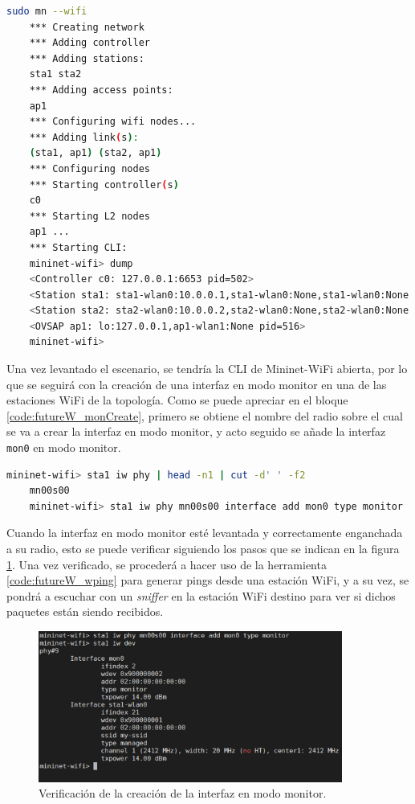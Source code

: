 \begin{lstlisting}[language= bash, style=Consola, caption={Ejecución del escenario},label=code:futureW_monScenario]
    sudo mn --wifi
    *** Creating network
    *** Adding controller
    *** Adding stations:
    sta1 sta2
    *** Adding access points:
    ap1
    *** Configuring wifi nodes...  
    *** Adding link(s):
    (sta1, ap1) (sta2, ap1)
    *** Configuring nodes
    *** Starting controller(s)
    c0
    *** Starting L2 nodes
    ap1 ...
    *** Starting CLI:
    mininet-wifi> dump
    <Controller c0: 127.0.0.1:6653 pid=502>
    <Station sta1: sta1-wlan0:10.0.0.1,sta1-wlan0:None,sta1-wlan0:None pid=509>
    <Station sta2: sta2-wlan0:10.0.0.2,sta2-wlan0:None,sta2-wlan0:None pid=511>
    <OVSAP ap1: lo:127.0.0.1,ap1-wlan1:None pid=516>
    mininet-wifi>


\end{lstlisting}

\vspace{0.5cm}
Una vez levantado el escenario, se tendría la CLI de Mininet-WiFi abierta, por lo que se seguirá con la creación de una interfaz en modo monitor en una de las estaciones WiFi de la topología. Como se puede apreciar en el bloque \ref{code:futureW_monCreate}, primero se obtiene el nombre del radio sobre el cual se va a crear la interfaz en modo monitor, y acto seguido se añade la interfaz \texttt{mon0} en modo monitor.

\begin{lstlisting}[language= bash, style=Consola, caption={Creación de interfaz en modo monitor},label=code:futureW_monCreate]
    mininet-wifi> sta1 iw phy | head -n1 | cut -d' ' -f2
    mn00s00
    mininet-wifi> sta1 iw phy mn00s00 interface add mon0 type monitor
\end{lstlisting}

\vspace{0.5cm}

Cuando la interfaz en modo monitor esté levantada y correctamente enganchada a su radio, esto se puede verificar siguiendo los pasos que se indican en la figura  \ref{fig:future_monverficacion}. Una vez verificado, se procederá a hacer uso de la herramienta \ref{code:futureW_wping} para generar pings desde una estación WiFi, y a su vez, se pondrá a escuchar con un \textit{sniffer} en la estación WiFi destino para ver si dichos paquetes están siendo recibidos.

\begin{figure}[ht]
    \centering
    \includegraphics[width=10cm]{archivos/img/conclusiones/future_work2.png}
    \caption{Verificación de la creación de la interfaz en modo monitor.}
    \label{fig:future_monverficacion}
\end{figure}

